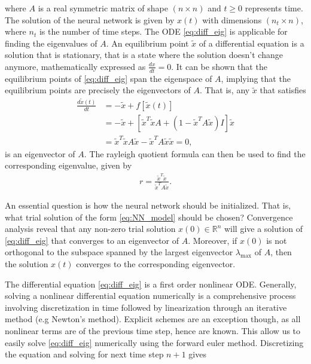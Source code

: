 \documentclass[12pt]{extarticle}
\begin{document}
where $A$ is a real symmetric matrix of shape $(n\times n)$ and $t \ge 0$ represents time. The solution of the neural network is given by $x(t)$ with dimensions $(n_t\times n)$, where $n_t$ is the number of time steps. The ODE \eqref{eq:diff_eig} is applicable for finding the eigenvalues of $A$. An equilibrium point $\tilde{x}$ of a differential equation is a solution that is stationary, that is a state where the solution doesn't change anymore, mathematically expressed as $\frac{dx}{dt} = 0$. It can be shown that the equilibrium points of \eqref{eq:diff_eig} span the eigenspace of $A$, implying that the equilibrium points are precisely the eigenvectors of $A$. That is, any $\tilde{x}$ that satisfies
\begin{align}
	\frac{d\tilde{x}(t)}{dt} &= -\tilde{x} + f[\tilde{x}(t)] \nonumber \\
	&= -\tilde{x} + [\tilde{x}^T\tilde{x}A + (1 - \tilde{x}^TA\tilde{x})I]\tilde{x} \nonumber \\
	&= \tilde{x}^T\tilde{x}A\tilde{x} - \tilde{x}^TA\tilde{x}\tilde{x} = 0,
\end{align}
is an eigenvector of $A$. The rayleigh quotient formula can then be used to find the corresponding eigenvalue, given by
\begin{align} \label{eq:rayleigh_quotient}
	r = \frac{\tilde{x}^T\tilde{x}}{\tilde{x}^T A \tilde{x}}.
\end{align}

An essential question is how the neural network should be initialized. That is, what trial solution of the form \eqref{eq:NN_model} should be chosen? Convergence analysis reveal that any non-zero trial solution $x(0) \in \mathbb{R}^n$ will give a solution of \eqref{eq:diff_eig} that converges to an eigenvector of $A$. Moreover, if $x(0)$ is not orthogonal to the subspace spanned by the largest eigenvector $\lambda_{\mathrm{max}}$ of $A$, then the solution $x(t)$ converges to the corresponding eigenvector.

The differential equation \eqref{eq:diff_eig} is a first order nonlinear ODE. Generally, solving a nonlinear differential equation numerically is a comprehensive process involving discretization in time followed by linearization through an iterative method (e.g Newton's method). Explicit schemes are an exception though, as all nonlinear terms are of the previous time step, hence are known. This allow us to easily solve \eqref{eq:diff_eig} numerically using the forward euler method. Discretizing the equation and solving for next time step $n+1$ gives
\end{document}
